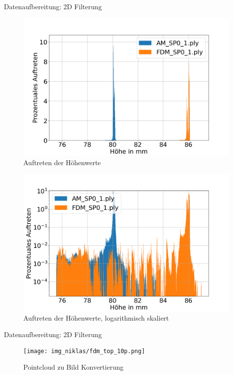 \documentclass[../slides.tex]{subfiles}
\begin{document}
\begin{frame}{Datenaufbereitung: 2D Filterung}
    \begin{minipage}[t]{.49\textwidth}
        \begin{figure}[]
            \includegraphics[width=\textwidth]{img_niklas/height_occurange.png}
            \caption{Auftreten der Höhenwerte}
            \label{fig:heights}
        \end{figure}
        \end{minipage}
        \hfill
        \begin{minipage}[t]{.49\textwidth}
        \begin{figure}[]
            \includegraphics[width=\textwidth]{img_niklas/height_occurange_log.png}
            \caption{Auftreten der Höhenwerte, logarithmisch skaliert}
            \label{fig:heightslog}
        \end{figure}
    \end{minipage}
\end{frame}

\begin{frame}{Datenaufbereitung: 2D Filterung}
    \begin{figure}
        \centering
        \texttt{[image: img\_niklas/fdm\_top\_10p.png]}
        \caption{Pointcloud zu Bild Konvertierung}
        \label{fig:filteredImage}
    \end{figure}
\end{frame}
\end{document}
